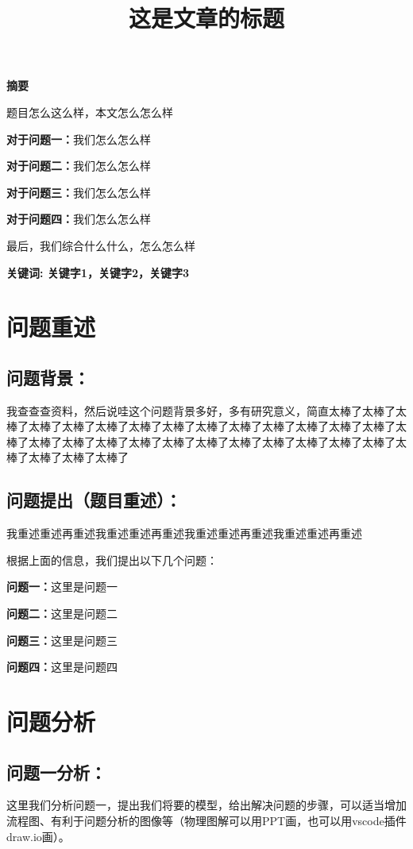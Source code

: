 \documentclass[zihao=-4,UTF8]{article}
\title{\textbf{这是文章的标题}}
\author{ }
\date{ }
\newcommand{\cnabstractname}{\large 摘要}
\newenvironment{cnabstract}{%
  \par
  \noindent\mbox{}\hfill{\bfseries \cnabstractname}\hfill\mbox{}\par
  }{\par}
\begin{document}
\maketitle
\thispagestyle{fancy}
\vspace{-75pt}
\begin{cnabstract}
  {\normalsize 
  题目怎么这么样，本文怎么怎么样\par
  \textbf{对于问题一：}我们怎么怎么样\par
  \textbf{对于问题二：}我们怎么怎么样\par
  \textbf{对于问题三：}我们怎么怎么样\par
  \textbf{对于问题四：}我们怎么怎么样\par
  最后，我们综合什么什么，怎么怎么样
  }\par
  \vspace{12pt}
  {\normalsize \textbf{关键词:  关键字1，关键字2，关键字3}}
  \end{cnabstract}
\setlength{\parindent}{2em}

\newpage
\section{问题重述}
\subsection{问题背景：}
我查查查资料，然后说哇这个问题背景多好，多有研究意义，简直太棒了太棒了太棒了太棒了太棒了太棒了太棒了太棒了太棒了太棒了太棒了太棒了太棒了太棒了太棒了太棒了太棒了太棒了太棒了太棒了太棒了太棒了太棒了太棒了太棒了太棒了太棒了太棒了太棒了太棒了
\subsection{问题提出（题目重述）：}
我重述重述再重述我重述重述再重述我重述重述再重述我重述重述再重述\par
根据上面的信息，我们提出以下几个问题：\par
\textbf{问题一：}这里是问题一\par
\textbf{问题二：}这里是问题二\par
\textbf{问题三：}这里是问题三\par
\textbf{问题四：}这里是问题四\par

\section{问题分析}
\subsection{问题一分析：}
这里我们分析问题一，提出我们将要的模型，给出解决问题的步骤，可以适当增加流程图、有利于问题分析的图像等（物理图解可以用PPT画，也可以用vscode插件draw.io画）。
\end{document}
